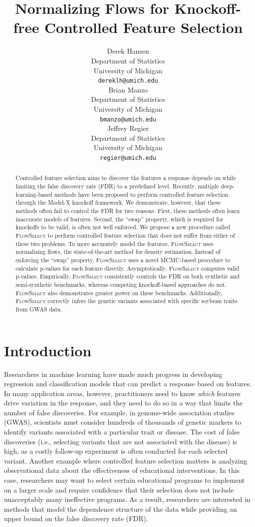 \documentclass{article}
\title{Normalizing Flows for Knockoff-free Controlled Feature Selection}
\author{%
  Derek Hansen\\
  Department of Statistics\\
  University of Michigan\\
  \texttt{dereklh@umich.edu} \\
  \And
  Brian Manzo \\
  Department of Statistics\\
  University of Michigan\\
  \texttt{bmanzo@umich.edu} \\
  \And
  Jeffrey Regier \\
  Department of Statistics\\
  University of Michigan\\
  \texttt{regier@umich.edu} \\
}
\newcommand{\FlowSelect}{\textsc{FlowSelect}\xspace}
\begin{document}
\maketitle


\begin{abstract}
Controlled feature selection aims to discover the features a response depends on while limiting the false discovery rate (FDR) to a predefined level.
Recently, multiple deep-learning-based methods have been proposed to perform controlled feature selection through the Model-X knockoff framework.
We demonstrate, however, that these methods often fail to control the FDR for two reasons.
First, these methods often learn inaccurate models of features. Second, the ``swap'' property, which is required for knockoffs to be valid, is often not well enforced.
We propose a new procedure called \FlowSelect
to perform controlled feature selection that does not suffer from either of these two problems.
To more accurately model the features, \FlowSelect uses normalizing flows, the state-of-the-art method for density estimation.
Instead of enforcing the ``swap'' property, \FlowSelect uses a novel MCMC-based procedure to calculate p-values for each feature directly.
Asymptotically,
\FlowSelect computes valid p-values.
Empirically, \FlowSelect consistently controls the FDR on both synthetic and semi-synthetic benchmarks, whereas competing knockoff-based approaches do not.
\FlowSelect also demonstrates greater power on these benchmarks.
Additionally, \FlowSelect correctly infers the genetic variants associated with specific soybean traits from GWAS data.
\end{abstract}

\section{Introduction}
Researchers in machine learning have made much progress in developing regression and classification models that can predict a response based on features.
In many application areas, however, practitioners need to know \textit{which} features drive variation in the response, and they need to do so in a way that limits the number of false discoveries.
For example, in genome-wide association studies (GWAS), scientists must consider
hundreds of thousands of genetic markers to identify variants associated with a particular trait or disease.
The cost of false discoveries (i.e., selecting variants that are not associated with the disease) is high, as a costly follow-up experiment is often conducted for each selected variant.
Another example where controlled feature selection matters
is analyzing observational data about the effectiveness of educational interventions. In this case, researchers may want to select certain educational programs to implement on a larger scale and require confidence that their selection does not include unacceptably many ineffective programs.
As a result, researchers are interested in methods that model the dependence structure of the data while providing an upper bound on the false discovery rate (FDR).
\end{document}
